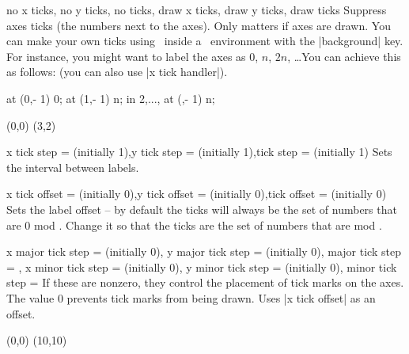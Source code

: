 \begin{sseqdata}[name = basic, cohomological Serre grading]
\begin{keylist}{no x ticks, no y ticks, no ticks, draw x ticks, draw y ticks, draw ticks}
Suppress axes ticks (the numbers next to the axes). Only matters if axes are drawn. You can make your own ticks using \tikzpkg\  inside a \scopeenv\  environment with the |background| key. For instance, you might want to label the axes as 0, $n$, $2n$, \ldots You can achieve this as follows: (you can also use |x tick handler|).
\begin{codeexample}[width = 5.7cm]
\begin{sseqpage}[ no x ticks, x range = {0}{3} ]
\begin{scope}[ background ]
    \node at (0,\ymin - 1) {0};
    \node at (1,\ymin - 1) {\protect\vphantom{2}n};
\foreach \n in {2,..., \xmax}{
    \node at (\n,\ymin - 1) {\n n};
}
\end{scope}
\class(0,0)
\class(3,2)
\end{sseqpage}
\end{codeexample}
\end{keylist}


\begin{keylist}{x tick step =  (initially 1),y tick step =  (initially 1),tick step =  (initially 1)}
Sets the interval between labels.
\end{keylist}

\begin{keylist}{x tick offset =  (initially 0),y tick offset =  (initially 0),tick offset =  (initially 0)}
Sets the label offset -- by default the ticks will always be the set of numbers that are 0 mod . Change it so that the ticks are the set of numbers that are  mod .
\end{keylist}

\begin{keylist}{
    x major tick step =  (initially 0),
    y major tick step =  (initially 0),
    major tick step = ,
    x minor tick step =  (initially 0),
    y minor tick step =  (initially 0),
    minor tick step = %
}
If these are nonzero, they control the placement of tick marks on the axes. The value 0 prevents tick marks from being drawn. Uses |x tick offset| as an offset.
\begin{codeexample}[width=7cm]
\begin{sseqpage}[
    tick step = 5,
    major tick step = 5,
    minor tick step = 1,
    scale = 0.4,
    axes type = frame
]
\class(0,0)
\class(10,10)
\end{sseqpage}
\end{codeexample}
\end{keylist}


\end{sseqdata}
